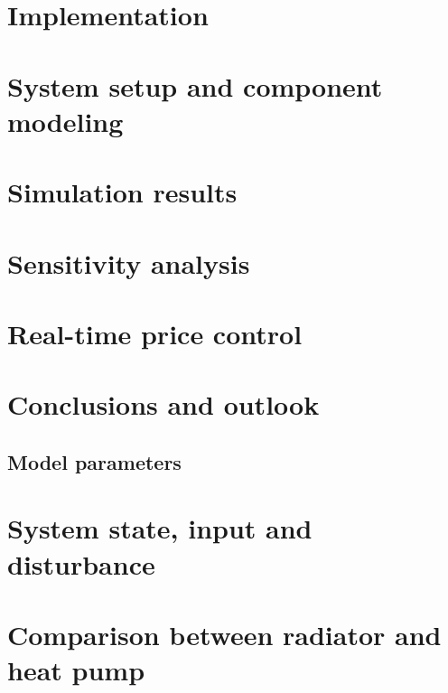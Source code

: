 \documentclass[a4paper,11pt,twoside,onecolumn]{book}
\begin{document}
\chapter{Implementation}
\label{Implementation}
%


\chapter{System setup and component modeling}
\label{modeling}
%

\chapter{Simulation results}
\label{results}
%
\chapter{Sensitivity analysis}
\label{sensitivity}
%


\chapter{Real-time price control}
\label{real_time}
%



\chapter{Conclusions and outlook}
\label{conclusion}
%


\appendix
\begin{landscape}
\chapter{Model parameters}
\label{sec:coefficients}
%
\end{landscape}


\chapter{System state, input and disturbance}
\label{system_states}
%

\chapter{Comparison between radiator and heat pump}
\label{RADHP}
%
\end{document}
